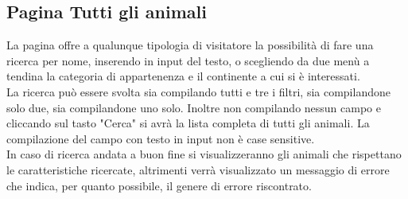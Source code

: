 \subsection{Pagina Tutti gli animali}
La pagina offre a qualunque tipologia di visitatore la possibilità di fare una ricerca per nome, inserendo in input del testo, o scegliendo da due menù a tendina la categoria di appartenenza e il continente a cui si è interessati.\\
La ricerca può essere svolta sia compilando tutti e tre i filtri, sia compilandone solo due, sia compilandone uno solo. Inoltre non compilando nessun campo e cliccando sul tasto "Cerca" si avrà la lista completa di tutti gli animali. La compilazione del campo con testo in input non è case sensitive.\\
In caso di ricerca andata a buon fine si visualizzeranno gli animali che rispettano le caratteristiche ricercate, altrimenti verrà visualizzato un messaggio di errore che indica, per quanto possibile, il genere di errore riscontrato.
\pagebreak
